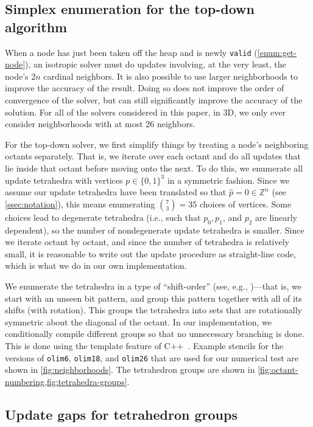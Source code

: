 \documentclass[eikonal.tex]{subfiles}
\begin{document}
\subsection{Simplex enumeration for the top-down
  algorithm}\label{ssec:simplex-enumeration}

When a node has just been taken off the heap and is newly
\texttt{valid} (\cref{enum:get-node}), an isotropic solver must do
updates involving, at the very least, the node's $2n$ cardinal
neighbors. It is also possible to use larger neighborhoods to improve
the accuracy of the result. Doing so does not improve the order of
convergence of the solver, but can still significantly improve the
accuracy of the solution. For all of the solvers considered in this
paper, in 3D, we only ever consider neighborhoods with at most 26
neighbors.

For the top-down solver, we first simplify things by treating a node's
neighboring octants separately. That is, we iterate over each octant
and do all updates that lie inside that octant before moving onto the
next. To do this, we enumerate all update tetrahedra with vertices
$p \in \{0, 1\}^3$ in a symmetric fashion. Since we assume our update
tetrahedra have been translated so that $\hat{p} = 0 \in \mathbb{Z}^n$
(see \cref{ssec:notation}), this means enumerating
${7 \choose 3} = 35$ choices of vertices. Some choices lead to
degenerate tetrahedra (i.e., such that $p_0, p_1$, and $p_2$ are
linearly dependent), so the number of nondegenerate update tetrahedra
is smaller. Since we iterate octant by octant, and since the number of
tetrahedra is relatively small, it is reasonable to write out the
update procedure as straight-line code, which is what we do in our own
implementation.

We enumerate the tetrahedra in a type of ``shift-order'' (see, e.g.,
\cite{arndt2010matters})---that is, we start with an unseen bit
pattern, and group this pattern together with all of its shifts (with
rotation). This groups the tetrahedra into sets that are rotationally
symmetric about the diagonal of the octant. In our implementation, we
conditionally compile different groups so that no unnecessary
branching is done. This is done using the template feature of
C++~\cite{stroustrup2013c++}. Example stencils for the versions of
\texttt{olim6}, \texttt{olim18}, and \texttt{olim26} that are used for
our numerical test are shown in \cref{fig:neighborhoods}. The
tetrahedron groups are shown in
\cref{fig:octant-numbering,fig:tetrahedra-groups}.

\subsection{Update gaps for tetrahedron
  groups}\label{ssec:update-gaps}
\end{document}
